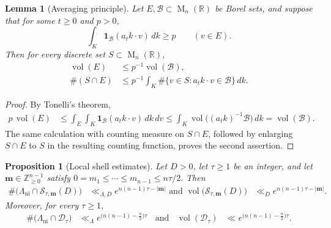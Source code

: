 \documentclass[reqno,11pt]{amsart}
\numberwithin{equation}{section}
\newtheorem{lemma}[theorem]{Lemma}
\newtheorem{proposition}[theorem]{Proposition}
\theoremstyle{definition}
\theoremstyle{remark}
\newcommand{\op}{\operatorname}
\newcommand{\R}{\mathbb R}
\newcommand{\M}{\op{M}}
\begin{document}
\begin{lemma}[Averaging principle]
\label{lem:shell-averaging}
Let $E,\mathscr B\subset\M_n(\R)$ be Borel sets, and suppose that for some $t\ge0$ and $p>0$,
$$
\int_K\mathbf 1_{\mathscr B}(a_tk\cdot v)\,dk\ge p
\qquad(v\in E).
$$
 Then for every discrete set $S\subset\M_n(\R)$,
\begin{align*}
\operatorname{vol}(E)
&\le p^{-1}\operatorname{vol}(\mathscr B),\\
\#(S\cap E)
&\le p^{-1}\int_K
\#\{v\in S:a_tk\cdot v\in\mathscr B\}\,dk.
\end{align*}
\end{lemma}
\begin{proof}
By Tonelli's theorem,
$$
\begin{aligned}
p\,\operatorname{vol}(E)
&\le
\int_E\int_K
\mathbf 1_{\mathscr B}(a_tk\cdot v)\,dk\,dv \le
\int_K\operatorname{vol}\bigl((a_tk)^{-1}\mathscr B\bigr)\,dk
=
\operatorname{vol}(\mathscr B).
\end{aligned}
$$
The same calculation with counting measure on $S\cap E$, followed by
enlarging $S\cap E$ to $S$ in the resulting counting function, proves
the second assertion.
\end{proof}


\begin{proposition}[Local shell estimates]
\label{lem:count-one-long-direction-shell}
Let $D>0$, let $\tau\ge1$ be an integer, and let
$
\mathbf m\in\mathbb Z_{\ge0}^{n-1}
$
satisfy
$
0=m_1\le\cdots\le m_{n-1}\le n\tau/2.
$
Then
\begin{equation}\label{eq:moderate-shell-count}
\begin{aligned}
\#\bigl(\Lambda_{\operatorname{ni}}
\cap\mathcal S_{\tau,\mathbf m}(D)\bigr)
&\ll_{\Lambda,D}e^{n(n-1)\tau-|\mathbf m|}\text{ and }\operatorname{vol}\bigl(\mathcal S_{\tau,\mathbf m}(D)\bigr)
&\ll_D e^{n(n-1)\tau-|\mathbf m|}.
\end{aligned}
\end{equation}
Moreover, for every $\tau\ge1$,
\begin{equation}\label{eq:deep-shell-count}
\begin{aligned}
\#\bigl(\Lambda_{\operatorname{ni}}\cap\mathcal D_\tau\bigr)
&\ll_\Lambda e^{\bigl(n(n-1)-\frac n2\bigr)\tau}\;\; \text{ and }\;\; \operatorname{vol}(\mathcal D_\tau)
&\ll e^{\bigl(n(n-1)-\frac n2\bigr)\tau}.
\end{aligned}
\end{equation}
\end{proposition}
\end{document}
